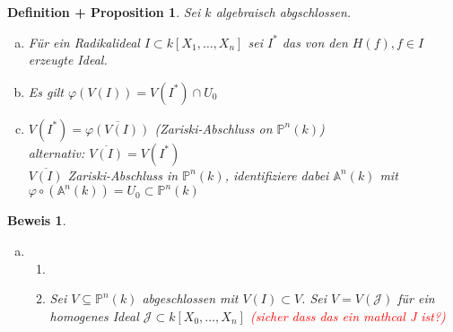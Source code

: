 \documentclass[a4paper,12pt]{report}
\theoremstyle{break}
\newtheorem{DefProp}[Def]{Definition + Proposition}
\theoremstyle{nonumberbreak}
\newtheorem{Bew}{Beweis}
\theoremstyle{nonumberplain}
\newcommand{\quot}[1]{\textrm{\glqq}{#1}\textrm{\grqq}}
\newenvironment{twosidedproofeq}{\begin{enumerate}[\quot{$\subseteq$}:]}{\end{enumerate}}
\newcommand{\proofsubseteq}{\item[\quot{$\subseteq$}:]}
\newcommand{\proofsupseteq}{\item[\quot{$\supseteq$}:]}
\newcommand{\A}{\mathbb{A}}
\newcommand{\IP}{\mathbb{P}}%
\begin{document}
\begin{DefProp}
Sei $k$ algebraisch abgschlossen.\begin{enumerate}[a)]
\item
	F\"ur ein Radikalideal $I\subset k[X_1,\ldots ,X_n]$ sei $I^*$ das von den $H(f),f\in I$ erzeugte Ideal.

\item
	Es gilt $\varphi(V(I))=V(I^*)\cap U_0$

\item
	$V(I^*)=\overline{\varphi(V(I))}$ (Zariski-Abschluss on $\IP^n(k)$)\\
	alternativ: $\overline{V(I)}=V(I^*)$\\
	$\overline{V(I)}$ Zariski-Abschluss in $\IP^n(k)$, identifiziere dabei $\A^n(k)$ mit $\varphi\circ(\A^n(k))=U_0\subset\IP^n(k)$
\end{enumerate}\end{DefProp}

\begin{Bew}\begin{enumerate}[a)]\item[c)]\begin{twosidedproofeq}\proofsubseteq \checkmark \proofsupseteq
Sei $V\subseteq\IP^n(k)$ abgeschlossen mit $V(I)\subset V$. Sei $V=V(\mathcal J)$ f\"ur ein homogenes Ideal $\mathcal J\subset k[X_0,\ldots ,X_n]$ \textcolor{red}{(sicher dass das ein mathcal J ist?)}\\
\end{twosidedproofeq}\end{enumerate}\end{Bew}
\end{document}
